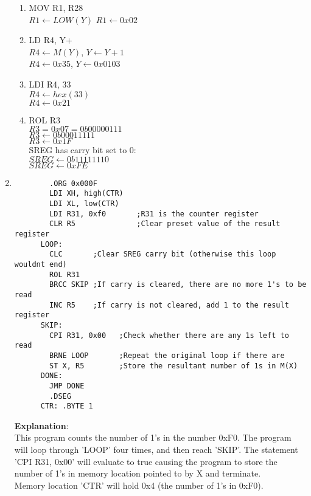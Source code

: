 \documentclass{article}
\begin{document}
\begin{enumerate}
\begin{enumerate}[label=(\roman*)]
        \item MOV R1, R28\\
          $R1 \leftarrow LOW(Y)$
          $R1 \leftarrow 0x02$
        \item LD  R4, Y+\\
          $R4 \leftarrow M(Y)$, $Y \leftarrow Y + 1$\\
          $R4 \leftarrow 0x35$, $Y \leftarrow 0x0103$
        \item LDI R4, 33\\
          $R4 \leftarrow hex(33)$\\
          $R4 \leftarrow 0x21$\\
        \item ROL R3\\
          $R3 = 0x07 = 0b00000111$\\
          $R3 \leftarrow 0b0001 1111$\\
          $R3 \leftarrow 0x1F$\\

          SREG has carry bit set to 0:\\
          $SREG \leftarrow 0b1111 1110$\\
          $SREG \leftarrow 0xFE$\\

        \end{enumerate}
      \item\begin{verbatim}
        .ORG 0x000F
        LDI XH, high(CTR)
        LDI XL, low(CTR)
        LDI R31, 0xf0       ;R31 is the counter register
        CLR R5              ;Clear preset value of the result register
      LOOP:   
        CLC       ;Clear SREG carry bit (otherwise this loop wouldnt end)
        ROL R31             
        BRCC SKIP ;If carry is cleared, there are no more 1's to be read
        INC R5    ;If carry is not cleared, add 1 to the result register
      SKIP:   
        CPI R31, 0x00   ;Check whether there are any 1s left to read
        BRNE LOOP       ;Repeat the original loop if there are
        ST X, R5        ;Store the resultant number of 1s in M(X)
      DONE:   
        JMP DONE
        .DSEG
      CTR: .BYTE 1  
        \end{verbatim}

        \textbf{Explanation}:\\
        This program counts the number of 1's in the number 0xF0.  The program will loop through 'LOOP' four times, and then reach 'SKIP'.  The statement 'CPI R31, 0x00' will evaluate to true causing the program to store the number of 1's in memory location pointed to by X and terminate.\\
        Memory location 'CTR' will hold 0x4 (the number of 1's in 0xF0).\\

  \end{enumerate}
\end{document}
